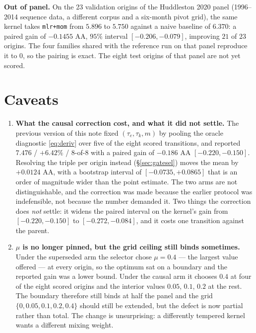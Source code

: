 \documentclass[11pt]{article}
\theoremstyle{remark}
\newcommand{\1}{\mathbf{1}}
\begin{document}
\medskip
\noindent
\textbf{Out of panel.} On the 23 validation origins of the Huddleston 2020 panel
(1996--2014 sequence data, a different corpus and a six-month pivot grid), the same kernel
takes \texttt{mlr+mom} from $5.896$ to $5.750$ against a naive baseline of $6.370$: a
paired gain of $-0.1455$ AA, $95\%$ interval $[-0.206, -0.079]$, improving $21$ of $23$
origins. The four families shared with the reference run on that panel reproduce it to
$0$, so the pairing is exact. The eight test origins of that panel are not yet scored.

\section{Caveats}\label{sec:caveats}

\begin{enumerate}
\item \textbf{What the causal correction cost, and what it did not settle.} The previous
version of this note fixed $(\tau_e, \tau_k, m)$ by pooling the oracle diagnostic
\eqref{eq:deriv} over five of the eight scored transitions, and reported $7.476$ /
$+6.42\%$ / $8$-of-$8$ with a paired gain of $-0.186$ AA $[-0.220, -0.150]$. Resolving the
triple per origin instead (\S\ref{sec:gatesel}) moves the mean by $+0.0124$ AA, with a
bootstrap interval of $[-0.0735, +0.0865]$ that is an order of magnitude wider than the
point estimate. The two arms are not distinguishable, and the correction was made because
the earlier protocol was indefensible, not because the number demanded it. Two things the
correction does \emph{not} settle: it widens the paired interval on the kernel's gain from
$[-0.220,-0.150]$ to $[-0.272,-0.084]$, and it costs one transition against the parent.

\item \textbf{$\mu$ is no longer pinned, but the grid ceiling still binds sometimes.}
Under the superseded arm the selector chose $\mu = 0.4$ --- the largest value offered ---
at every origin, so the optimum sat on a boundary and the reported gain was a lower bound.
Under the causal arm it chooses $0.4$ at four of the eight scored origins and the interior
values $0.05$, $0.1$, $0.2$ at the rest. The boundary therefore still binds at half the
panel and the grid $\{0, 0.05, 0.1, 0.2, 0.4\}$ should still be extended, but the defect is
now partial rather than total. The change is unsurprising: a differently tempered kernel
wants a different mixing weight.


\end{enumerate}
\end{document}
